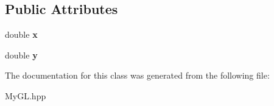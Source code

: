 \subsection*{Public Attributes}
\begin{DoxyCompactItemize}
\item 
\hypertarget{classCursorMovement_ac77861debf3dc2013b7ee0f6775b6540}{}double {\bfseries x}\label{classCursorMovement_ac77861debf3dc2013b7ee0f6775b6540}

\item 
\hypertarget{classCursorMovement_afab93e8fcc9f845fdcf6fffdf9232cab}{}double {\bfseries y}\label{classCursorMovement_afab93e8fcc9f845fdcf6fffdf9232cab}

\end{DoxyCompactItemize}


The documentation for this class was generated from the following file\+:\begin{DoxyCompactItemize}
\item 
My\+G\+L.\+hpp\end{DoxyCompactItemize}
